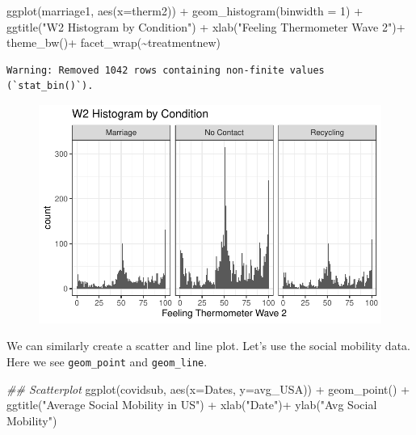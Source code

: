 \documentclass[
  letterpaper,
  DIV=11,
  numbers=noendperiod]{scrreprt}
\newenvironment{Shaded}{\begin{snugshade}}{\end{snugshade}}
\newcommand{\AttributeTok}[1]{\textcolor[rgb]{0.40,0.45,0.13}{#1}}
\newcommand{\DecValTok}[1]{\textcolor[rgb]{0.68,0.00,0.00}{#1}}
\newcommand{\DocumentationTok}[1]{\textcolor[rgb]{0.37,0.37,0.37}{\textit{#1}}}
\newcommand{\FunctionTok}[1]{\textcolor[rgb]{0.28,0.35,0.67}{#1}}
\newcommand{\NormalTok}[1]{\textcolor[rgb]{0.00,0.23,0.31}{#1}}
\newcommand{\SpecialCharTok}[1]{\textcolor[rgb]{0.37,0.37,0.37}{#1}}
\newcommand{\StringTok}[1]{\textcolor[rgb]{0.13,0.47,0.30}{#1}}
\begin{document}
\begin{Shaded}
\begin{Highlighting}[]
\FunctionTok{ggplot}\NormalTok{(marriage1, }\FunctionTok{aes}\NormalTok{(}\AttributeTok{x=}\NormalTok{therm2)) }\SpecialCharTok{+}
  \FunctionTok{geom\_histogram}\NormalTok{(}\AttributeTok{binwidth =} \DecValTok{1}\NormalTok{) }\SpecialCharTok{+}
  \FunctionTok{ggtitle}\NormalTok{(}\StringTok{"W2 Histogram by Condition"}\NormalTok{) }\SpecialCharTok{+}
  \FunctionTok{xlab}\NormalTok{(}\StringTok{"Feeling Thermometer Wave 2"}\NormalTok{)}\SpecialCharTok{+}
  \FunctionTok{theme\_bw}\NormalTok{()}\SpecialCharTok{+}
  \FunctionTok{facet\_wrap}\NormalTok{(}\SpecialCharTok{\textasciitilde{}}\NormalTok{treatmentnew)}
\end{Highlighting}
\end{Shaded}

\begin{verbatim}
Warning: Removed 1042 rows containing non-finite values (`stat_bin()`).
\end{verbatim}

\begin{figure}[H]

{\centering \includegraphics{04-Visualization_files/figure-pdf/unnamed-chunk-49-1.pdf}

}

\end{figure}

We can similarly create a scatter and line plot. Let's use the social
mobility data. Here we see \texttt{geom\_point} and \texttt{geom\_line}.

\begin{Shaded}
\begin{Highlighting}[]
\DocumentationTok{\#\# Scatterplot}
\FunctionTok{ggplot}\NormalTok{(covidsub, }\FunctionTok{aes}\NormalTok{(}\AttributeTok{x=}\NormalTok{Dates, }\AttributeTok{y=}\NormalTok{avg\_USA)) }\SpecialCharTok{+}
  \FunctionTok{geom\_point}\NormalTok{() }\SpecialCharTok{+}
  \FunctionTok{ggtitle}\NormalTok{(}\StringTok{"Average Social Mobility in US"}\NormalTok{) }\SpecialCharTok{+}
  \FunctionTok{xlab}\NormalTok{(}\StringTok{"Date"}\NormalTok{)}\SpecialCharTok{+}
  \FunctionTok{ylab}\NormalTok{(}\StringTok{"Avg Social Mobility"}\NormalTok{)}
\end{Highlighting}
\end{Shaded}
\end{document}
